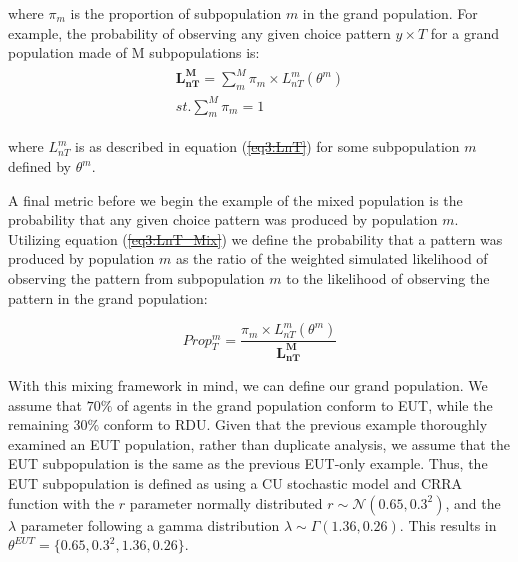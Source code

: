 \documentclass[11pt,a4paper]{article} %
\providecommand{\DIFaddtex}[1]{{\protect\color{blue}\uwave{#1}}} %
\providecommand{\DIFdeltex}[1]{{\protect\color{red}\sout{#1}}}                      %
\providecommand{\DIFaddbegin}{} %
\providecommand{\DIFaddend}{} %
\providecommand{\DIFdelbegin}{} %
\providecommand{\DIFdelend}{} %
\providecommand{\DIFadd}[1]{\texorpdfstring{\DIFaddtex{#1}}{#1}} %
\providecommand{\DIFdel}[1]{\texorpdfstring{\DIFdeltex{#1}}{}} %
\newcommand{\DIFscaledelfig}{0.5}
\newlength{\DIFdelgraphicswidth} %
\newlength{\DIFdelgraphicsheight} %
\newcommand{\DIFaddincludegraphics}[2][]{{\color{blue}\fbox{\DIFOincludegraphics[#1]{#2}}}} %
\newcommand{\DIFdelincludegraphics}[2][]{%
\sbox{\DIFdelgraphicsbox}{\DIFOincludegraphics[#1]{#2}}%
\settoboxwidth{\DIFdelgraphicswidth}{\DIFdelgraphicsbox} %
\settoboxtotalheight{\DIFdelgraphicsheight}{\DIFdelgraphicsbox} %
\scalebox{\DIFscaledelfig}{%
\parbox[b]{\DIFdelgraphicswidth}{\usebox{\DIFdelgraphicsbox}\\[-\baselineskip] \rule{\DIFdelgraphicswidth}{0em}}\llap{\resizebox{\DIFdelgraphicswidth}{\DIFdelgraphicsheight}{%
\setlength{\unitlength}{\DIFdelgraphicswidth}%
\begin{picture}(1,1)%
\thicklines\linethickness{2pt} %
{\color[rgb]{1,0,0}\put(0,0){\framebox(1,1){}}}%
{\color[rgb]{1,0,0}\put(0,0){\line( 1,1){1}}}%
{\color[rgb]{1,0,0}\put(0,1){\line(1,-1){1}}}%
\end{picture}%
}\hspace*{3pt}}} %
} %
\DeclareRobustCommand{\DIFaddbegin}{\DIFOaddbegin \let\includegraphics\DIFaddincludegraphics} %
\DeclareRobustCommand{\DIFaddend}{\DIFOaddend \let\includegraphics\DIFOincludegraphics} %
\DeclareRobustCommand{\DIFdelbegin}{\DIFOdelbegin \let\includegraphics\DIFdelincludegraphics} %
\DeclareRobustCommand{\DIFdelend}{\DIFOaddend \let\includegraphics\DIFOincludegraphics} %
\begin{document}
\noindent where $\pi_m$ is the proportion of subpopulation $m$ in the grand population.
For example, the probability of observing any given choice pattern $y \times T$ for a grand population made of M subpopulations is:
\begin{align}
	\DIFdelbegin %
\DIFdelend \DIFaddbegin \label{eq:LnT_Mix}
	\DIFaddend \begin{split}
		\bm{L_{nT}^M} = \sum_m^M \pi_m \times L_{nT}^m(\theta^m) \\ 
		\mathit{st.} \sum_m^M \pi_m = 1
	\end{split}
\end{align}

\noindent where $L_{nT}^m$ is as described in equation (\DIFdelbegin \DIFdel{\ref{eq3:LnT}}\DIFdelend \DIFaddbegin \DIFadd{\ref{eq:LnT}}\DIFaddend ) for some subpopulation $m$ defined by $\theta^m$.

A final metric before we begin the example of the mixed population is the probability that any given choice pattern was produced by population $m$.
Utilizing equation (\DIFdelbegin \DIFdel{\ref{eq3:LnT_Mix}}\DIFdelend \DIFaddbegin \DIFadd{\ref{eq:LnT_Mix}}\DIFaddend ) we define the probability that a pattern was produced by population $m$ as the ratio of the weighted simulated likelihood of observing the pattern from subpopulation $m$ to the likelihood of observing the pattern in the grand population:

\begin{equation}
	\DIFdelbegin %
\DIFdelend \DIFaddbegin \label{eq:Propm}
	\DIFaddend \mathit{Prop^m_{T}} = \frac{\pi_m \times L_{nT}^m(\theta^m) }{\bm{L_{nT}^M}}
\end{equation}

With this mixing framework in mind, we can define our grand population.
We assume that $70\%$ of agents in the grand population conform to EUT, while the remaining $30\%$ conform to RDU.
Given that the previous example thoroughly examined an EUT population, rather than duplicate analysis, we assume that the EUT subpopulation is the same as the previous EUT-only example.
Thus, the EUT subpopulation is defined as using a CU stochastic model and CRRA function with the $r$ parameter normally distributed $r \sim \mathcal{N}(0.65 , 0.3^2 )$, and the $\lambda$ parameter following a gamma distribution $\lambda \sim \Gamma(1.36 , 0.26)$.
This results in $\theta^{EUT} = \lbrace 0.65 ,0.3^2, 1.36 , 0.26\rbrace$.
\end{document}

